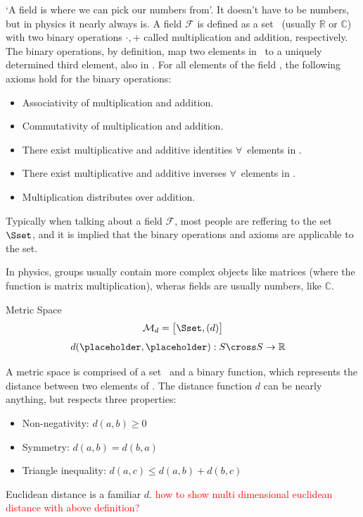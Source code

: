 `A field is where we can pick our numbers from'. It doesn't have to be numbers, but in physics it nearly always is. A field \(\mathcal{F}\) is defined as a set \Sset\ (usually \(\mathbb{R}\) or \(\mathbb{C}\)) with two binary operations \(\cdot,+\) called multiplication and addition, respectively.
The binary operations, by definition, map two elements in \Sset\ to a uniquely determined third element, also in \Sset. For all elements of the field \Fset, the following axioms hold for the binary operations:
\begin{itemize}
	\item Associativity of multiplication and addition.
	\item Commutativity of multiplication and addition.
	\item There exist multiplicative and additive identities \(\forall\)\ elements in \Fset.
	\item There exist multiplicative and additive inverses \(\forall\)\ elements in \Fset.
	\item Multiplication distributes over addition.
\end{itemize}

Typically when talking about a field \(\mathcal{F}\), most people are reffering to the set \(\Sset\), and it is implied that the binary operations and axioms are applicable to the set. 

In physics, groups usually contain more complex objects like matrices (where the function is matrix multiplication), wheras fields are usually numbers, like \(\mathbb{C}\). 
\newpage
\begin{mathbox}{Metric Space}
	\begin{equation*}
		\mathcal{M}_d=\big[\Sset, (d)\big]
	\end{equation*}
	\begin{align*}
	d(\placeholder,\placeholder):S\cross S&\rightarrow \mathbb{R}
	\end{align*}
\end{mathbox}
A metric space is comprised of a set \Sset\ and a binary function, which represents the distance between two elements of \Sset. The distance function \(d\) can be nearly anything, but respects three properties:
\begin{itemize}
	\item Non-negativity: \(d(a,b)\geq0\)
	\item Symmetry: \(d(a,b)=d(b,a)\)
	\item Triangle inequality: \(d(a,c)\leq d(a,b)+d(b,c)\)
\end{itemize}
Euclidean distance is a familiar \(d\).
\textcolor{red}{how to show multi dimensional euclidean distance with above definition?}

